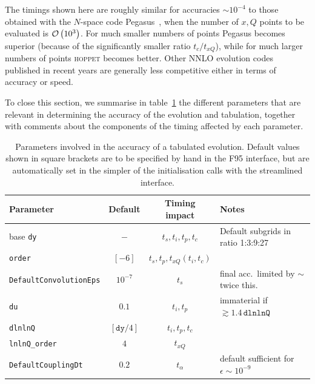\documentclass[12pt]{article}
\newcommand{\comment}[1]{\textbf{[#1]}}
\newcommand{\hoppet}{\textsc{hoppet}\xspace}
\newcommand{\ttt}[1]{\texttt{#1}}
\newcommand{\order}[1]{{\cal O}\left(#1\right)}
\begin{document}
The timings shown here are roughly similar for accuracies $\sim
10^{-4}$ to those obtained with the $N$-space code
Pegasus~\cite{Pegasus}, when the number of $x,Q$ points to be
evaluated is $\order{10^3}$. For much smaller numbers of points
Pegasus becomes superior (because of the significantly smaller ratio
$t_c/t_{xQ}$), while for much larger numbers of points \hoppet becomes
better. Other NNLO evolution codes published in recent years 
\cite{Weinzierl:2002mv,coriano,Botje}
 are generally less competitive
either in terms of accuracy or speed.

To close this section, we summarise in table~\ref{tab:acc-param} the
different parameters that are relevant in determining the accuracy of
the evolution and tabulation, together with comments about the
components of the timing affected by each parameter.


\begin{table}
  \centering
  \begin{tabular}{|l|c|c|l|} \hline
    Parameter & Default & Timing impact & Notes \\ \hline
    base \ttt{dy}  &  $-$    &   $t_s, t_i, t_p, t_c$    & Default subgrids
    in ratio 1:3:9:27 \\
    \ttt{order} &  $[-6]$    &   $t_s, t_p, t_{xQ} (t_i, t_c)$ & \\ 
    \ttt{DefaultConvolutionEps} & $10^{-7}$ & $t_s$ & final acc.\
    limited by $\sim$ twice this.\\ \hline
    \ttt{du}  &  $0.1$ &  $t_i, t_p$ & immaterial if $\gtrsim 1.4\,
    \ttt{dlnlnQ}$\\
    \ttt{dlnlnQ}       &  $[\ttt{dy}/4] $ &  $t_i, t_p, t_c$ &  \\
    \ttt{lnlnQ\_order} &  $4$ &  $t_{xQ}$ &  \\ \hline
    \ttt{DefaultCouplingDt} & $0.2$ & $t_\alpha$ & default sufficient for 
$\epsilon \sim 10^{-9}$\\
    \hline
  \end{tabular}
  \caption{Parameters involved in the accuracy
of a tabulated evolution. Default values shown in square
    brackets are to be specified by hand in the F95 interface, but are
    automatically set in the simpler of the initialisation calls with
    the streamlined interface.} 
  \label{tab:acc-param}
\end{table}
\end{document}
